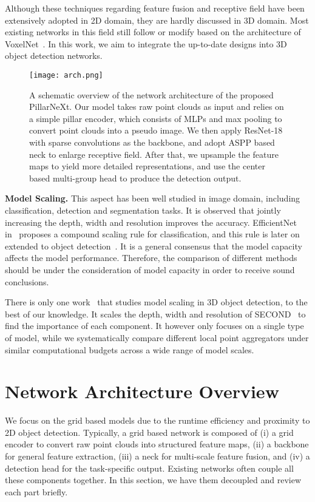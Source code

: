 \documentclass[10pt,twocolumn,letterpaper]{article}
\begin{document}
Although these techniques regarding feature fusion and receptive field have been extensively adopted in 2D domain, they are hardly discussed in 3D domain. Most existing networks in this field still follow or modify based on the architecture of VoxelNet~\cite{zhou2018voxelnet}. In this work, we aim to integrate the up-to-date designs into 3D object detection networks.      


\begin{figure*}[t]
  \centering
   \texttt{[image: arch.png]}
   \caption{A schematic overview of the network architecture of the proposed PillarNeXt. Our model takes raw point clouds as input and relies on a simple pillar encoder, which consists of MLPs and max pooling to convert point clouds into a pseudo image. We then apply ResNet-18 with sparse convolutions as the backbone, and adopt ASPP based neck to enlarge receptive field. After that, we upsample the feature maps to yield more detailed representations, and use the center based multi-group head to produce the detection output.} 
   \vspace{-1mm}
   \label{fig:sup-arch}
\end{figure*}


\noindent\textbf{Model Scaling.} 
This aspect has been well studied in image domain, including classification, detection and segmentation tasks. It is observed that jointly increasing the depth, width and resolution improves the accuracy. EfficientNet in~\cite{tan2019efficientnet} proposes a compound scaling rule for classification, and this rule is later on extended to object detection~\cite{tan2020efficientdet, dollar2021fast}. It is a general consensus that the model capacity affects the model performance. Therefore, the comparison of different methods should be under the consideration of model capacity in order to receive sound conclusions.

There is only one work~\cite{wang2022cost} that studies model scaling in 3D object detection, to the best of our knowledge. It scales the depth, width and resolution of SECOND~\cite{yan2018second} to find the importance of each component. It however only focuses on a single type of model, while we systematically compare different local point aggregators under similar computational budgets across a wide range of model scales. 
 


\section{Network Architecture Overview}
We focus on the grid based models due to the runtime efficiency and proximity to 2D object detection. 
Typically, a grid based network is composed of (i) a grid encoder to convert raw point clouds into structured feature maps, (ii) a backbone for general feature extraction, (iii) a neck for multi-scale feature fusion, and (iv) a detection head for the task-specific output. Existing networks often couple all these components together. In this section, we have them decoupled and review each part briefly. 
\end{document}
